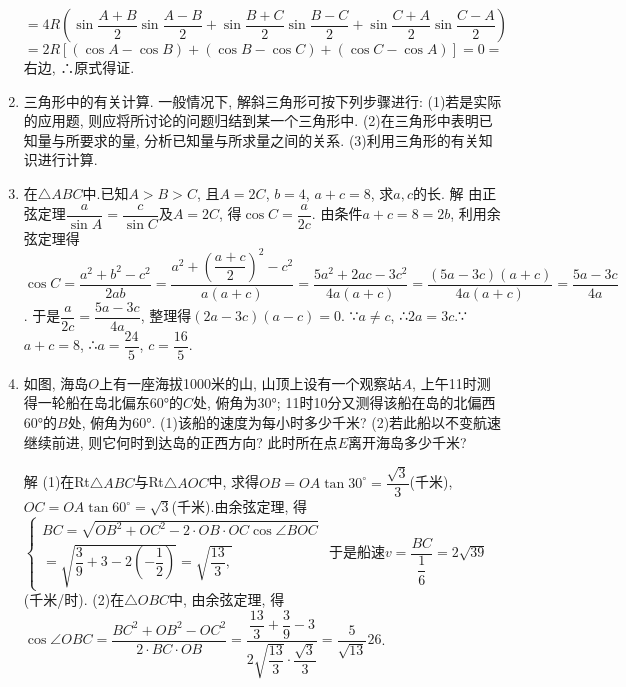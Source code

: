 \documentclass[10pt,a4paper]{article}
\begin{document}
\begin{enumerate}[1.]
$=4R(\sin \dfrac{A+B}2\sin \dfrac{A-B}2+\sin \dfrac{B+C}2\sin \dfrac{B-C}2+\sin \dfrac{C+A}2\sin \dfrac{C-A}2)$
$=2R[(\cos A-\cos B)+(\cos B-\cos C)+(\cos C-\cos A)]=0=$右边,
∴原式得证.
\item 三角形中的有关计算.
一般情况下, 解斜三角形可按下列步骤进行:
(1)若是实际的应用题, 则应将所讨论的问题归结到某一个三角形中.
(2)在三角形中表明已知量与所要求的量, 分析已知量与所求量之间的关系.
(3)利用三角形的有关知识进行计算.
\item 在$\triangle ABC$中.已知$A>B>C$, 且$A=2C$, $b=4$, $a+c=8$, 求$a,c$的长.
解  由正弦定理$\dfrac a{\sin A}=\dfrac c{\sin C}$及$A=2C$, 得$\cos C=\dfrac a{2c}$.
由条件$a+c=8=2b$, 利用余弦定理得
$\cos C=\dfrac{a^2+b^2-c^2}{2ab}=\dfrac{a^2+(\dfrac{a+c}2)^2-c^2}{a(a+c)}=\dfrac{5a^2+2ac-3c^2}{4a(a+c)}=\dfrac {(5a-3c)(a+c)}{4a(a+c)}=\dfrac{5a-3c}{4a}$.
于是$\dfrac a{2c}=\dfrac{5a-3c}{4a}$, 整理得$(2a-3c)(a-c)=0$.
∵$a\ne c$, ∴$2a=3c$.∵$a+c=8$, ∴$a=\dfrac{24}5$, $c=\dfrac{16}5$.
\item 如图, 海岛$O$上有一座海拔1000米的山, 山顶上设有一个观察站$A$, 上午11时测得一轮船在岛北偏东60°的$C$处, 俯角为30°; 11时10分又测得该船在岛的北偏西60°的$B$处, 俯角为60°.
(1)该船的速度为每小时多少千米?
(2)若此船以不变航速继续前进, 则它何时到达岛的正西方向? 此时所在点$E$离开海岛多少千米?
\begin{center}
\end{center}
解  (1)在Rt$\triangle ABC$与Rt$\triangle AOC$中, 求得$OB=OA\tan 30^\circ =\dfrac{\sqrt 3}3$(千米),
$OC=OA\tan 60^{\circ}=\sqrt 3$(千米).由余弦定理, 得
$\begin{cases} BC=\sqrt {OB^2+OC^2-2\cdot OB\cdot OC\cos \angle BOC} \\ =\sqrt {\dfrac 39+3-2(-\dfrac 12)}=\sqrt {\dfrac{13}3,}
\end{cases}$
于是船速$v=\dfrac{BC}{\dfrac 16}=2\sqrt {39}$(千米/时).
(2)在$\triangle OBC$中, 由余弦定理, 得$\cos \angle OBC=\dfrac{BC^2+OB^2-OC^2}{2\cdot BC\cdot OB}=\dfrac{\dfrac{13}3+\dfrac 39-3}{2\sqrt {\dfrac{13}3}\cdot \dfrac{\sqrt 3}3}=\dfrac 5{\sqrt {13}}{26}$.

\end{enumerate}
\end{document}
